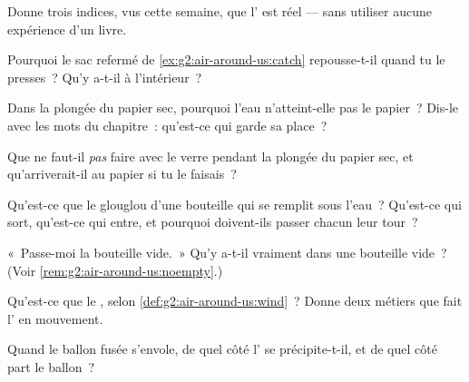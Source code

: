 \begin{exercise}[$\star$]\label{exo:g2:air-around-us:1}
Donne trois indices, vus cette semaine, que l' est réel --- sans
utiliser aucune expérience d'un livre.
\end{exercise}

\begin{exercise}[$\star$]\label{exo:g2:air-around-us:2}
Pourquoi le sac refermé de \cref{ex:g2:air-around-us:catch}
repousse-t-il quand tu le presses~? Qu'y a-t-il à l'intérieur~?
\end{exercise}

\begin{exercise}[$\star$]\label{exo:g2:air-around-us:3}
Dans la plongée du papier sec, pourquoi l'eau n'atteint-elle pas le
papier~? Dis-le avec les mots du chapitre~: qu'est-ce qui garde sa
place~?
\end{exercise}

\begin{exercise}[$\star$]\label{exo:g2:air-around-us:4}
Que ne faut-il \emph{pas} faire avec le verre pendant la plongée du
papier sec, et qu'arriverait-il au papier si tu le faisais~?
\end{exercise}

\begin{exercise}[$\star$]\label{exo:g2:air-around-us:5}
Qu'est-ce que le glouglou d'une bouteille qui se remplit sous l'eau~?
Qu'est-ce qui sort, qu'est-ce qui entre, et pourquoi doivent-ils
passer chacun leur tour~?
\end{exercise}

\begin{exercise}[$\star$]\label{exo:g2:air-around-us:6}
«~Passe-moi la bouteille vide.~» Qu'y a-t-il vraiment dans une
bouteille vide~? (Voir \cref{rem:g2:air-around-us:noempty}.)
\end{exercise}

\begin{exercise}[$\star$]\label{exo:g2:air-around-us:7}
Qu'est-ce que le , selon \cref{def:g2:air-around-us:wind}~? Donne
deux métiers que fait l' en mouvement.
\end{exercise}

\begin{exercise}[$\star$]\label{exo:g2:air-around-us:8}
Quand le ballon fusée s'envole, de quel côté l' se précipite-t-il,
et de quel côté part le ballon~?
\end{exercise}

